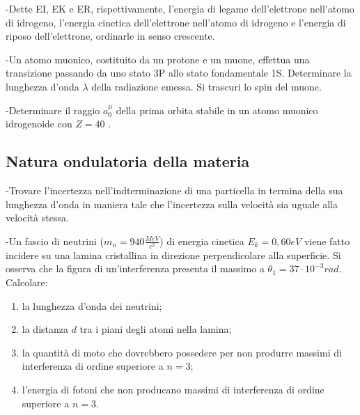 \documentclass[12pt,twoside,a4]{article}
\begin{document}
\begin{esercizio}
	-Dette EI, EK e ER, rispettivamente, l'energia di legame dell'elettrone nell'atomo di idrogeno, l'energia cinetica dell'elettrone nell'atomo di idrogeno e l'energia di riposo dell'elettrone, ordinarle in senso crescente.
\end{esercizio}

\begin{esercizio}
	-Un atomo muonico, costituito da un protone e un muone, effettua una transizione passando da uno stato 3P allo stato fondamentale 1S. Determinare la lunghezza d'onda $\lambda$ della radiazione emessa. Si trascuri lo spin del muone.
\end{esercizio}

\begin{esercizio}
	-Determinare il raggio $a^\mu_0$ della prima orbita stabile in un atomo muonico idrogenoide con $Z = 40$  .
\end{esercizio}

\newpage
\subsection{Natura ondulatoria della materia}
\begin{esercizio}
	-Trovare l'incertezza nell'indterminazione di una particella in termina della sua lunghezza d'onda in maniera tale che l'incertezza sulla velocità  sia uguale alla velocità  stessa.
\end{esercizio}

\begin{esercizio}
	-Un fascio di neutrini ($m_n =940 \frac{MeV}{c^2}$) di energia cinetica $E_k=0,60 eV$ viene fatto incidere su una lamina cristallina in direzione perpendicolare alla superficie. Si osserva che la figura di un'interferenza presenta il massimo a $\theta_1=37 \cdot 10^{-3}rad$. Calcolare:
	\begin{enumerate}[label=(\textit{\roman*})]
		\item la lunghezza d'onda dei neutrini;
		\item la distanza $d$ tra i piani degli atomi nella lamina;
		\item la quantità  di moto che dovrebbero possedere per non produrre massimi di interferenza di ordine superiore a $n=3$;
		\item l'energia di fotoni che non producano massimi di interferenza di ordine superiore a $n=3$.
	\end{enumerate}
\end{esercizio}
\end{document}
